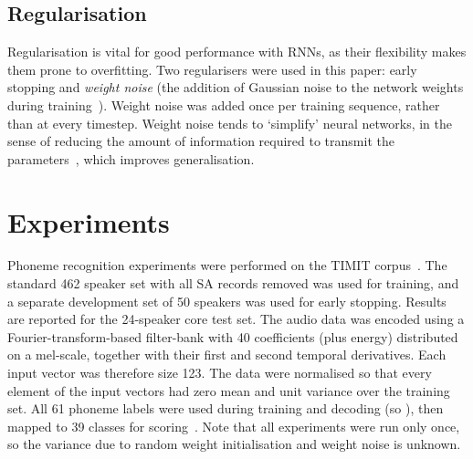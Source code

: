 \documentclass{article}
\begin{document}
\subsection{Regularisation}
Regularisation is vital for good performance with RNNs, as their flexibility makes them prone to overfitting.
Two regularisers were used in this paper: early stopping and \emph{weight noise} (the addition of Gaussian noise to the network weights during training~\cite{chuen96noise}).
Weight noise was added once per training sequence, rather than at every timestep. 
Weight noise tends to `simplify' neural networks, in the sense of reducing the amount of information required to transmit the parameters~\cite{hinton93bitsback,graves11nips}, which improves generalisation.

\section{Experiments}
\label{sec:experiments}

Phoneme recognition experiments were performed on the TIMIT corpus~\cite{timit}.
The standard 462 speaker set with all SA records removed was used for training, and a separate development set of 50 speakers was used for early stopping. 
Results are reported for the 24-speaker core test set.
The audio data was encoded using a Fourier-transform-based filter-bank with 40 coefficients (plus energy) distributed on a mel-scale, together with their first and second temporal derivatives.
Each input vector was therefore size 123.
The data were normalised so that every element of the input vectors had zero mean and unit variance over the training set. 
All 61 phoneme labels were used during training and decoding (so ), then mapped to 39 classes for scoring~\cite{lee89timit39}.
Note that all experiments were run only once, so the variance due to random weight initialisation and weight noise is unknown.
\end{document}
